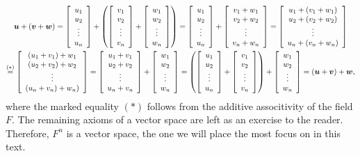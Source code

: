 \begin{Exam}
\begin{multline*}\bb u+(\bb v+\bb w) = \mtx{c}{u_1\\u_2\\\vdots\\u_n} + \left(\mtx{c}{v_1\\v_2\\\vdots\\v_n} + \mtx{c}{w_1\\w_2\\\vdots\\w_n}\right) = \mtx{c}{u_1\\u_2\\\vdots\\u_n} + \mtx{c}{v_1+w_1\\v_2+w_2\\\vdots\\v_n+w_n} = \mtx{c}{u_1+(v_1+w_1)\\u_2+(v_2+w_2)\\\vdots\\u_n+(v_n+w_n)}\\ \overset{(*)}{=} \mtx{c}{(u_1+v_1)+w_1\\(u_2+v_2)+w_2\\\vdots\\(u_n+v_n)+w_n)} = \mtx{c}{u_1+v_1\\u_2+v_2\\\vdots\\u_n+v_n} + \mtx{c}{w_1\\w_2\\\vdots\\w_n} = \left(\mtx{c}{u_1\\u_2\\\vdots\\u_n} + \mtx{c}{v_1\\v_2\\\vdots\\v_n}\right) + \mtx{c}{w_1\\w_2\\\vdots\\w_n} = (\bb u + \bb v) + \bb w,
\end{multline*} where the marked equality $(*)$ follows from the additive associtivity of the field $F$. The remaining axioms of a vector space are left as an exercise to the reader. Therefore, $F^n$ is a vector space, the one we will place the most focus on in this text.
\end{Exam}\vs

